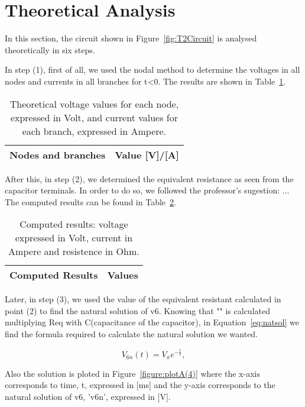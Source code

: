 \section{Theoretical Analysis}
\label{sec:analysis}

In this section, the circuit shown in Figure~\ref{fig:T2Circuit} is analysed theoretically in six steps.

In step (1), first of all, we used the nodal method to determine the voltages in all nodes and currents in all branches for t<0. The results are shown in Table~\ref{tab:TA1}.

\begin{table}[h]
  \centering
  \begin{tabular}{|l|r|}
    \hline    
    {\bf Nodes and branches} & {\bf Value [V]/[A]} \\ \hline
    
  \end{tabular}
  \caption{Theoretical voltage values for each node, expressed in Volt, and current values for each branch, expressed in Ampere.}
  \label{tab:TA1}
\end{table}

After this, in step (2), we determined the equivalent resistance as seen from the capacitor terminals. In order to do so, we followed the professor's sugestion: ... The computed results can be found in Table~\ref{tab:TA2}.

\begin{table}[h]
  \centering
  \begin{tabular}{|l|r|}
    \hline    
    {\bf Computed Results} & {\bf Values} \\ \hline
    
  \end{tabular}
  \caption{Computed results: voltage expressed in Volt, current in Ampere and resistence in Ohm.}
  \label{tab:TA2}
\end{table}

Later, in step (3), we used the value of the equivalent resistant calculated in point (2) to find the natural solution of v6. Knowing that "\tau" is calculated multiplying Req with C(capacitance of the capacitor), in Equation~\ref{eq:natsol} we find the formula required to calculate the natural solution we wanted. 

\begin{equation}
  V_{6n}(t) = V_{x}e^{-\frac{t}{\tau}},
  \label{eq:natsol}
\end{equation}

Also the solution is ploted in Figure~\ref{figure:plotA(4)} where the x-axis corresponds to time, t, expressed in [ms] and the y-axis corresponds to the natural solution of v6, 'v6n', expressed in [V].

